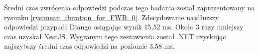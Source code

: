 Średni czas zwrócenia odpowiedzi podczas tego badania został zaprezentowany na rysunku \ref{rys:mean_duration_for_FWB_0}.
Zdecydowanie najdłuższy odpowiedzi przypadł Django osiągając wynik 15,52 ms.
Około 3 razy mniejszy czas uzyskał NestJS.
Wygranym tego zestawienia został .NET uzyskując najszybszy średni czas odpowiedzi na poziomie 3.58 ms.
